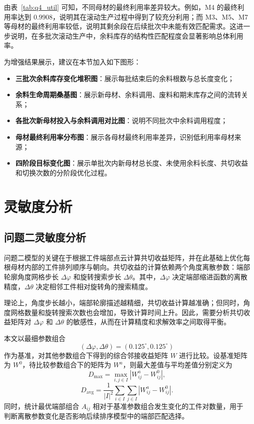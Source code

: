 \documentclass[UTF8]{ctexart}
\begin{document}
由表~\ref{tab:q4_util} 可知，不同母材的最终利用率差异较大。例如，M4 的最终利用率达到 $0.9908$，说明其在滚动生产过程中得到了较充分利用；而 M3、M5、M7 等母材的最终利用率较低，说明其剩余段在后续批次中未能有效匹配需求。这进一步说明，在多批次滚动生产中，余料库存的结构性匹配程度会显著影响总体利用率。

为增强结果展示，建议在本节加入如下图形：

\begin{itemize}
    \item \textbf{三批次余料库存变化堆积图}：展示每批结束后的余料根数与总长度变化；
    \item \textbf{余料生命周期桑基图}：展示新母材、余料调用、废料和期末库存之间的流转关系；
    \item \textbf{各批次新母材投入与余料调用对比图}：说明不同批次中余料调用程度；
    \item \textbf{母材最终利用率分布图}：展示各母材最终利用率差异，识别低利用率母材来源；
    \item \textbf{四阶段目标变化图}：展示单批次内新母材总长度、未使用余料长度、共切收益和切换次数的分阶段优化过程。
\end{itemize}


\section{灵敏度分析} 



\subsection{问题二灵敏度分析}

问题二模型的关键在于根据工件端部点云计算共切收益矩阵，并在此基础上优化每根母材内部的工件排列顺序与朝向。共切收益的计算依赖两个角度离散参数：端部轮廓角度网格步长 $\Delta\varphi$ 和旋转搜索步长 $\Delta\theta$。其中，$\Delta\varphi$ 决定端部缩进函数的离散精度，$\Delta\theta$ 决定相邻工件相对旋转角的搜索精度。

理论上，角度步长越小，端部轮廓描述越精细，共切收益计算越准确；但同时，角度网格数量和旋转搜索次数也会增加，导致计算时间上升。因此，需要分析共切收益矩阵对 $\Delta\varphi$ 和 $\Delta\theta$ 的敏感性，从而在计算精度和求解效率之间取得平衡。

本文以最细参数组合
\[
(\Delta\varphi,\Delta\theta)=(0.125^\circ,0.125^\circ)
\]
作为基准，对其他参数组合下得到的综合邻接收益矩阵 $W$ 进行比较。设基准矩阵为 $W^{0}$，待比较参数组合下的矩阵为 $W^{a}$，则最大差值与平均差值分别定义为
\[
D_{\max}=\max_{i,j\in I}\left|W_{ij}^{a}-W_{ij}^{0}\right|,
\]
\[
D_{\mathrm{avg}}=\frac{1}{|I|^2}\sum_{i\in I}\sum_{j\in I}\left|W_{ij}^{a}-W_{ij}^{0}\right|.
\]
同时，统计最优端部组合 $A_{ij}$ 相对于基准参数组合发生变化的工件对数量，用于判断离散参数变化是否影响后续排序模型中的端部匹配选择。
\end{document}
